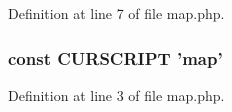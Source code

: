 Definition at line 7 of file map.\+php.

\hypertarget{map_8php_a39c39f525eceb86cabc338804f230e80}{
\subsubsection[{C\+U\+R\+S\+C\+R\+I\+P\+T}]{\setlength{\rightskip}{0pt plus 5cm}const C\+U\+R\+S\+C\+R\+I\+P\+T 'map'}}\label{map_8php_a39c39f525eceb86cabc338804f230e80}


Definition at line 3 of file map.\+php.

